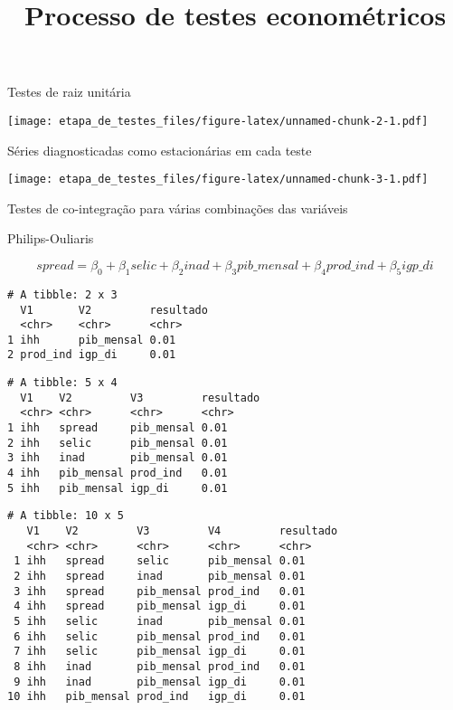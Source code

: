\documentclass[]{article}
\title{Processo de testes econométricos}
\author{}
\date{}
\begin{document}
\maketitle

\begin{center}\LARGE{Testes de raiz unitária}\end{center}

\texttt{[image: etapa\_de\_testes\_files/figure-latex/unnamed-chunk-2-1.pdf]}

\newpage

\begin{center}\LARGE{Séries diagnosticadas como estacionárias em cada teste}\end{center}

\texttt{[image: etapa\_de\_testes\_files/figure-latex/unnamed-chunk-3-1.pdf]}

\newpage

\begin{center}\LARGE{Testes de co-integração para várias combinações das variáveis}\end{center}\begin{center}\large{Philips-Ouliaris}\end{center}

\[ spread = \beta_0 + \beta_1selic + \beta_2inad + \beta_3pib\_mensal + \beta_4prod\_ind + \beta_5igp\_di \]

\begin{verbatim}
# A tibble: 2 x 3
  V1       V2         resultado
  <chr>    <chr>      <chr>    
1 ihh      pib_mensal 0.01     
2 prod_ind igp_di     0.01     
\end{verbatim}

\begin{verbatim}
# A tibble: 5 x 4
  V1    V2         V3         resultado
  <chr> <chr>      <chr>      <chr>    
1 ihh   spread     pib_mensal 0.01     
2 ihh   selic      pib_mensal 0.01     
3 ihh   inad       pib_mensal 0.01     
4 ihh   pib_mensal prod_ind   0.01     
5 ihh   pib_mensal igp_di     0.01     
\end{verbatim}

\begin{verbatim}
# A tibble: 10 x 5
   V1    V2         V3         V4         resultado
   <chr> <chr>      <chr>      <chr>      <chr>    
 1 ihh   spread     selic      pib_mensal 0.01     
 2 ihh   spread     inad       pib_mensal 0.01     
 3 ihh   spread     pib_mensal prod_ind   0.01     
 4 ihh   spread     pib_mensal igp_di     0.01     
 5 ihh   selic      inad       pib_mensal 0.01     
 6 ihh   selic      pib_mensal prod_ind   0.01     
 7 ihh   selic      pib_mensal igp_di     0.01     
 8 ihh   inad       pib_mensal prod_ind   0.01     
 9 ihh   inad       pib_mensal igp_di     0.01     
10 ihh   pib_mensal prod_ind   igp_di     0.01     
\end{verbatim}
\end{document}
